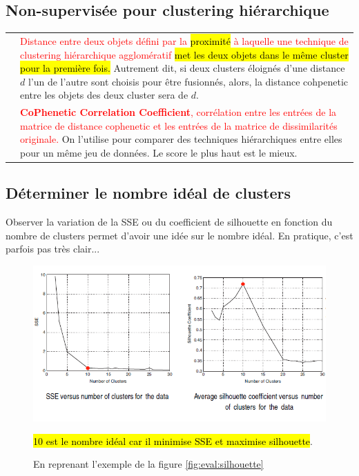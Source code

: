 \documentclass[letterpaper, 12pt]{article}
\newcommand{\alinea}{
\hspace*{0.5cm}}
\newcommand{\red}[1]{
	\textcolor{red}{#1}}
\newcommand{\myul}[1]{
		\underline{\smash{#1}}
	}
\begin{document}
		\subsection{Non-supervisée pour clustering hiérarchique}
			\begin{tabular}{lp{13cm}}
				\myul{\textbf{\hl{Cophenetic distance}}} &
					\red{Distance entre deux objets défini par la 
						 \hl{proximité} à laquelle une technique de 
						 clustering hiérarchique agglomératif
						 \hl{met les deux objets dans le même cluster
						 pour la première fois.}} Autrement dit, 
						 si deux clusters éloignés d'une distance
						 $d$ l'un de l'autre sont choisis pour
						 être fusionnés, alors, la distance cohpenetic
						 entre les objets des deux cluster sera de $d$.\\
				\myul{\textbf{\hl{CPCC}}} &
					\red{\textbf{CoPhenetic Correlation Coefficient}, 
						corrélation entre les entrées de la matrice de
						 distance cophenetic et les entrées de la 
						 matrice de dissimilarités originale.} On l'utilise
						 pour comparer des techniques hiérarchiques
						 entre elles pour un même jeu de données. Le score
						 le plus haut est le mieux.
			\end{tabular}
		\subsection{Déterminer le nombre idéal de clusters}
			\alinea Observer la variation de la SSE ou du coefficient
				de silhouette en fonction du nombre de clusters permet
				d'avoir une idée sur le nombre idéal. En pratique,
				c'est parfois pas très clair...
			\begin{figure}[H]
				\centering
				\includegraphics[scale=0.8]{Images/clusters_number.png}
				\caption{En reprenant l'exemple de la figure
				\ref{fig:eval:silhouette}} \hl{10 est le nombre idéal car
				il minimise SSE et maximise silhouette}.
				\label{fig:eval:clusters_number}
			\end{figure}\noindent
		\newpage
\end{document}
